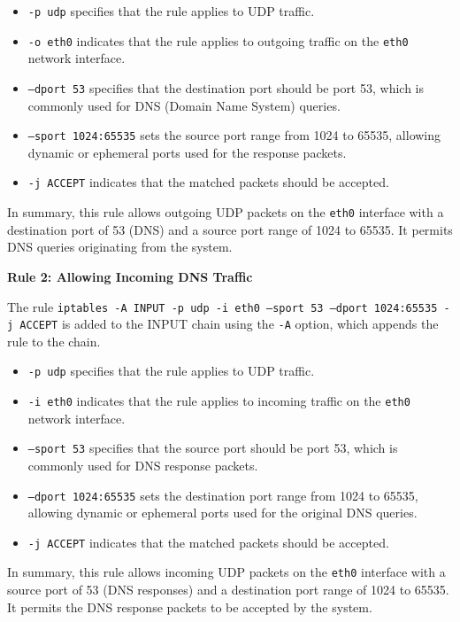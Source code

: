 {{		\begin{itemize}
			\item \texttt{-p udp} specifies that the rule applies to UDP traffic.
			\item \texttt{-o eth0} indicates that the rule applies to outgoing traffic on the \texttt{eth0} network interface.
			\item \texttt{--dport 53} specifies that the destination port should be port 53, which is commonly used for DNS (Domain Name System) queries.
			\item \texttt{--sport 1024:65535} sets the source port range from 1024 to 65535, allowing dynamic or ephemeral ports used for the response packets.
			\item \texttt{-j ACCEPT} indicates that the matched packets should be accepted.
		\end{itemize}
		
		In summary, this rule allows outgoing UDP packets on the \texttt{eth0} interface with a destination port of 53 (DNS) and a source port range of 1024 to 65535. It permits DNS queries originating from the system.
		
		\textbf{Rule 2: Allowing Incoming DNS Traffic}
		
		The rule \texttt{iptables -A INPUT -p udp -i eth0 --sport 53 --dport 1024:65535 -j ACCEPT} is added to the INPUT chain using the \texttt{-A} option, which appends the rule to the chain.
		
		\begin{itemize}
			\item \texttt{-p udp} specifies that the rule applies to UDP traffic.
			\item \texttt{-i eth0} indicates that the rule applies to incoming traffic on the \texttt{eth0} network interface.
			\item \texttt{--sport 53} specifies that the source port should be port 53, which is commonly used for DNS response packets.
			\item \texttt{--dport 1024:65535} sets the destination port range from 1024 to 65535, allowing dynamic or ephemeral ports used for the original DNS queries.
			\item \texttt{-j ACCEPT} indicates that the matched packets should be accepted.
		\end{itemize}
		
		In summary, this rule allows incoming UDP packets on the \texttt{eth0} interface with a source port of 53 (DNS responses) and a destination port range of 1024 to 65535. It permits the DNS response packets to be accepted by the system.}
			
}

